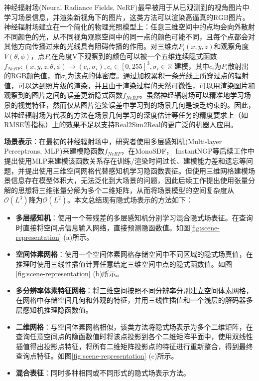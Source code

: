 神经辐射场(Neural Radiance Fields, NeRF)\cite{mildenhall_nerf_2020}最早被用于从已观测到的视角图片中学习场景信息，并渲染新视角下的图片，这类方法可以渲染高逼真的RGB图片。神经辐射场建立在一个简化的物理光照模型上：任意三维空间中的点均会向外散射不同颜色的光，从不同视角观察空间中的同一点的颜色可能不同，且每个点都会对其他方向传播过来的光线具有阻碍传播的作用。对三维点$P_i (x,y,z)$和观察角度$V(\theta,\phi)$，点$P_i$在角度V下观察到的颜色可以被一个五维连续隐式函数$f_{NeRF}:(x,y,z,\theta,\phi)\to (c_i,\sigma_i),c_i\in[0,255]^3,\sigma_i\in \mathbb{R}$ 建模，其中$c_i$为$P_i$散射出的RGB颜色值，而$\sigma_i$为该点的体密度。通过加权累积一条光线上所穿过点的辐射值，可以达到照片级的渲染，并且由于渲染过程的天然可微性，可以用渲染图片和观察到的图片之间的误差更新隐式函数$f_{NeRF}$。虽然神经辐射场可以精准地学习场景的视觉特征，然而仅从图片渲染误差中学习到的场景几何是缺乏约束的。因此，以神经辐射场为代表的方法在场景几何学习的深度估计等任务的精度要求上（如RMSE等指标）上的效果不足以支持Real2Sim2Real的更广泛的机器人应用。

\textbf{场景表示}：在最初的神经辐射场中，研究者使用多层感知机(Multi-layer Perceptrons, MLP)来建模隐函数$f_{NeRF}$，在MonoSDF\cite{yu_monosdf_2022}， InstantNGP\cite{muller_instant_2022}等后续工作中提出使用MLP来建模该函数关系存在训练/渲染时间过长、建模能力差和遗忘等问题，并提出使用三维空间网格代替感知机学习隐函数表征。但使用三维网格建模场景信息存在模型体积大，无法泛化到大场景的问题，因此后续工作\cite{chen_tensorf_2022, fridovich-keil_k-planes_2023, cao_hexplane_2023, reiser_merf_2023}提出使用张量分解\cite{kolda_tensor_2009}的思想将三维张量分解为多个二维矩阵，从而将场景模型的空间复杂度从$\mathcal O (L^3)$降为$\mathcal O (L^2)$。本文总结现有隐式场表示的方法如下：
\begin{itemize}
    \item \textbf{多层感知机}：使用一个带残差的多层感知机分别学习混合隐式场表征。在查询时直接将空间点信息输入网络，直接预测隐函数值。如图\ref{fig:scene-representation} (a)所示。
    \item \textbf{空间体素网格}：使用一个空间体素网格存储空间中不同区域的隐式场真值，在推理时使用三线性插值计算任意给定三维空间中点的隐式函数值。如图\ref{fig:scene-representation} (b)所示。
    \item \textbf{多分辨率体素特征网格}：将三维空间按照不同分辨率分别建立空间体素网格，在网格中存储空间几何和外观的特征，并用三线性插值和一个浅层的解码器多层感知机推理隐函数值。
    \item \textbf{二维网格}：与空间体素网格相似，该类方法将隐式场表示为多个二维矩阵，在查询任意空间点的隐函数值时将该点投影到各个二维矩阵平面中，使用双线性插值得出投影点特征，将所有二维矩阵投影点的特征进行重新整合，得到最终查询点特征。如图\ref{fig:scene-representation} (c)所示。
    \item \textbf{混合表征}：同时多种相同或不同形式的隐式场表示方法。
\end{itemize}

